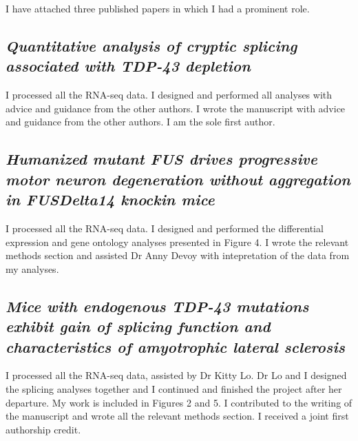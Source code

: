 I have attached three published papers in which I had a prominent role.


\subsection*{\textit{Quantitative analysis of cryptic splicing associated with TDP-43 depletion}}

I processed all the RNA-seq data. I designed and performed all analyses with advice and guidance from the other authors. I wrote the manuscript with advice and guidance from the other authors. I am the sole first author.

\subsection*{\textit{Humanized mutant FUS drives progressive motor neuron degeneration without aggregation in FUSDelta14 knockin mice}}

I processed all the RNA-seq data. I designed and performed the differential expression and gene ontology analyses presented in Figure 4. I wrote the relevant methods section and assisted Dr Anny Devoy with intepretation of the data from my analyses.



\subsection*{\textit{Mice with endogenous TDP-43 mutations exhibit gain of splicing function and characteristics of amyotrophic lateral sclerosis}}

I processed all the RNA-seq data, assisted by Dr Kitty Lo. Dr Lo and I designed the splicing analyses together and I continued and finished the project after her departure. My work is included in Figures 2 and 5. I contributed to the writing of the manuscript and wrote all the relevant methods section. I received a joint first authorship credit.

\clearpage









%
%

